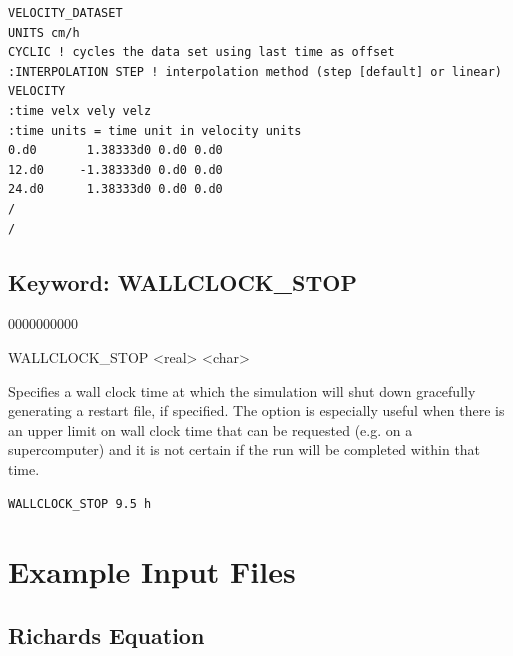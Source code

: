 \documentclass[12pt]{article}
\begin{document}

\begin{verbatim}
VELOCITY_DATASET
UNITS cm/h
CYCLIC ! cycles the data set using last time as offset
:INTERPOLATION STEP ! interpolation method (step [default] or linear)
VELOCITY
:time velx vely velz
:time units = time unit in velocity units
0.d0       1.38333d0 0.d0 0.d0 
12.d0     -1.38333d0 0.d0 0.d0 
24.d0      1.38333d0 0.d0 0.d0 
/
/
\end{verbatim}


\newpage
\protect\hypertarget{target_wallclk}{}

\subsection{Keyword: WALLCLOCK\_STOP}
\begin{deflist}{0000000000}
\item[WALLCLOCK\_STOP] <real> <char>
\end{deflist}

 Specifies a wall clock time at which the simulation will shut down gracefully generating a restart file, if specified. The option is especially useful when there is an upper limit on wall clock time that can be requested (e.g. on a supercomputer) and it is not certain if the run will be completed within that time.

 {\tt WALLCLOCK\_STOP 9.5 h}

\newpage
\section{Example Input Files}

\subsection{Richards Equation}
\end{document}
